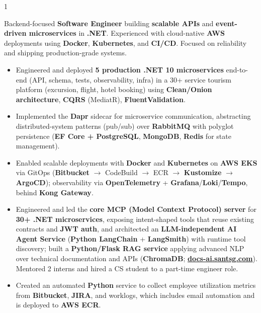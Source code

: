 \documentclass[11pt,a4paper]{altacv}
\makeatletter
\renewcommand{\namefont}{\LARGE\bfseries}
\renewcommand{\taglinefont}{\normalsize\bfseries}
\renewcommand{\personalinfofont}{\footnotesize}
\renewcommand{\makecvheader}{%
  \begingroup
    \begin{minipage}{\linewidth}%
    \raggedright%
    {\namefont\color{name}\MakeUppercase{\@name}\par}
    \smallskip
    {\taglinefont\color{tagline}\@tagline\par}
    \smallskip
    {\personalinfofont\@personalinfo\par}
    \end{minipage}\par%
  \endgroup
}
\makeatother
\begin{document}


\begin{fullwidth}
\makecvheader
\end{fullwidth}

\begin{paracol}{1}

Backend-focused \textbf{Software Engineer} building \textbf{scalable APIs} and \textbf{event-driven microservices} in \textbf{.NET}. Experienced with cloud-native \textbf{AWS} deployments using \textbf{Docker}, \textbf{Kubernetes}, and \textbf{CI/CD}. Focused on reliability and shipping production-grade systems.


\begin{itemize}
  \item Engineered and deployed \textbf{5 production .NET 10 microservices} end-to-end (API, schema, tests, observability, infra) in a 30+ service tourism platform (excursion, flight, hotel booking) using \textbf{Clean/Onion architecture}, \textbf{CQRS} (MediatR), \textbf{FluentValidation}.
  \item Implemented the \textbf{Dapr} sidecar for microservice communication, abstracting distributed-system patterns (pub/sub) over \textbf{RabbitMQ} with polyglot persistence (\textbf{EF Core + PostgreSQL}, \textbf{MongoDB}, \textbf{Redis} for state management).
  \item Enabled scalable deployments with \textbf{Docker} and \textbf{Kubernetes} on \textbf{AWS EKS} via GitOps (\textbf{Bitbucket} $\rightarrow$ CodeBuild $\rightarrow$ ECR $\rightarrow$ \textbf{Kustomize} $\rightarrow$ \textbf{ArgoCD}); observability via \textbf{OpenTelemetry} + \textbf{Grafana}/\textbf{Loki}/\textbf{Tempo}, behind \textbf{Kong Gateway}.
  \item Engineered and led the \textbf{core MCP (Model Context Protocol) server} for \textbf{30+ .NET microservices}, exposing intent-shaped tools that reuse existing contracts and \textbf{JWT auth}, and architected an \textbf{LLM-independent AI Agent Service} (\textbf{Python LangChain} + \textbf{LangSmith}) with runtime tool discovery; built a \textbf{Python/Flask RAG service} applying advanced NLP over technical documentation and APIs (\textbf{ChromaDB}; \href{https://docs-ai.santsg.com}{\textbf{docs-ai.santsg.com}}). Mentored 2 interns and hired a CS student to a part-time engineer role.
  \item Created an automated \textbf{Python} service to collect employee utilization metrics from \textbf{Bitbucket}, \textbf{JIRA}, and worklogs, which includes email automation and is deployed to \textbf{AWS ECR}.
\end{itemize}


\end{paracol}
\end{document}
